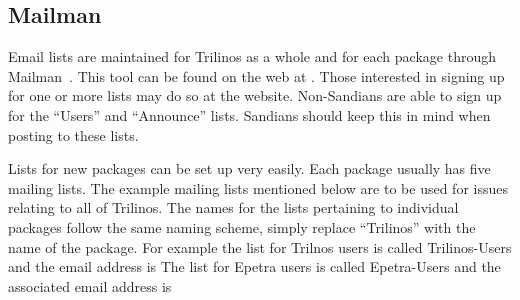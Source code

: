 \documentclass[12pt,strict]{TrilinosDevGuide}
\begin{document}
\subsection{Mailman}
\label{subsect:MailMan}
Email lists are maintained for Trilinos as a whole and for each package 
through Mailman~\cite{Mailman}.  This tool can be found on the web at 
\newline
{}.  
Those interested in signing 
up for one or more lists may do so at the website.  Non-Sandians are able to 
sign up for the ``Users'' and ``Announce'' lists.  Sandians should keep this 
in mind when posting to these lists.

Lists for new packages can be set up very easily.  Each package usually has 
five mailing lists.  The example mailing lists mentioned below are to be used 
for issues relating to all of Trilinos.  The names for the lists pertaining to 
individual packages follow the same naming scheme, simply replace ``Trilinos'' 
with the name of the package.  For example the list for Trilnos users is 
called Trilinos-Users and the email address is 
  The list 
for Epetra users is called Epetra-Users and the associated email address is 
\end{document}
